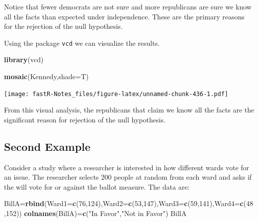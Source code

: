 \documentclass[]{book}
\newenvironment{Shaded}{\begin{snugshade}}{\end{snugshade}}
\newcommand{\KeywordTok}[1]{\textcolor[rgb]{0.13,0.29,0.53}{\textbf{#1}}}
\newcommand{\DataTypeTok}[1]{\textcolor[rgb]{0.13,0.29,0.53}{#1}}
\newcommand{\DecValTok}[1]{\textcolor[rgb]{0.00,0.00,0.81}{#1}}
\newcommand{\StringTok}[1]{\textcolor[rgb]{0.31,0.60,0.02}{#1}}
\newcommand{\NormalTok}[1]{#1}
\theoremstyle{definition}
\theoremstyle{definition}
\theoremstyle{definition}
\theoremstyle{remark}
\begin{document}
Notice that fewer democrats are not sure and more republicans are sure
we know all the facts than expected under independence. These are the
primary reasons for the rejection of the null hypothesis.

Using the package \texttt{vcd} we can visualize the results.

\begin{Shaded}
\begin{Highlighting}[]
\KeywordTok{library}\NormalTok{(vcd)}
\end{Highlighting}
\end{Shaded}

\begin{Shaded}
\begin{Highlighting}[]
\KeywordTok{mosaic}\NormalTok{(Kennedy,}\DataTypeTok{shade=}\NormalTok{T)}
\end{Highlighting}
\end{Shaded}

\texttt{[image: fastR-Notes\_files/figure-latex/unnamed-chunk-436-1.pdf]}

From this visual analysis, the republicans that claim we know all the
facts are the significant reason for rejection of the null hypothesis.

\subsection{Second Example}\label{second-example}

Consider a study where a researcher is interested in how different wards
vote for an issue. The researcher selects 200 people at random from each
ward and asks if the will vote for or against the ballot measure. The
data are:

\begin{Shaded}
\begin{Highlighting}[]
\NormalTok{BillA=}\KeywordTok{rbind}\NormalTok{(}\DataTypeTok{Ward1=}\KeywordTok{c}\NormalTok{(}\DecValTok{76}\NormalTok{,}\DecValTok{124}\NormalTok{),}\DataTypeTok{Ward2=}\KeywordTok{c}\NormalTok{(}\DecValTok{53}\NormalTok{,}\DecValTok{147}\NormalTok{),}\DataTypeTok{Ward3=}\KeywordTok{c}\NormalTok{(}\DecValTok{59}\NormalTok{,}\DecValTok{141}\NormalTok{),}\DataTypeTok{Ward4=}\KeywordTok{c}\NormalTok{(}\DecValTok{48}\NormalTok{,}\DecValTok{152}\NormalTok{))}
\KeywordTok{colnames}\NormalTok{(BillA)=}\KeywordTok{c}\NormalTok{(}\StringTok{"In Favor"}\NormalTok{,}\StringTok{"Not in Favor"}\NormalTok{)}
\NormalTok{BillA}
\end{Highlighting}
\end{Shaded}
\end{document}
